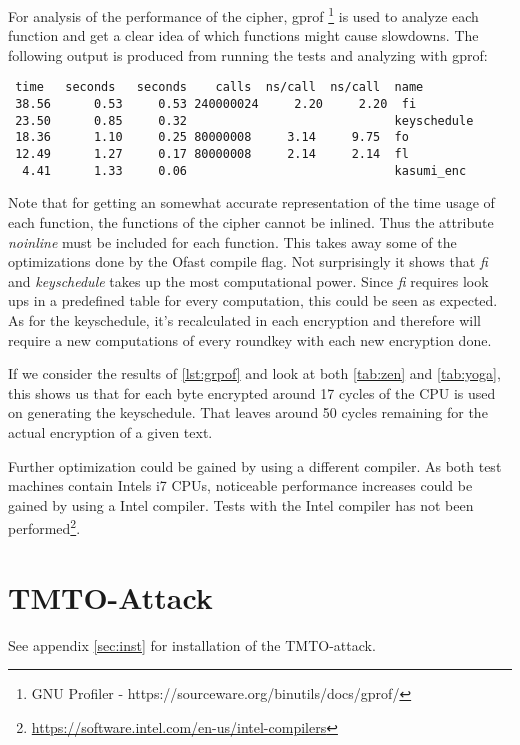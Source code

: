 For analysis of the performance of the cipher, gprof \footnote{GNU
  Profiler - https://sourceware.org/binutils/docs/gprof/} is used to
analyze each function and get a clear idea of which functions might
cause slowdowns. The following output is produced from running the
tests and analyzing with gprof:
\begin{lstlisting}[caption=Gprof output,captionpos=b,label=lst:grpof]
    %   cumulative   self              self     total
 time   seconds   seconds    calls  ns/call  ns/call  name
 38.56      0.53     0.53 240000024     2.20     2.20  fi
 23.50      0.85     0.32                             keyschedule
 18.36      1.10     0.25 80000008     3.14     9.75  fo
 12.49      1.27     0.17 80000008     2.14     2.14  fl
  4.41      1.33     0.06                             kasumi_enc
\end{lstlisting}
Note that for getting an somewhat accurate representation of the time usage of
each function, the functions of the cipher cannot be inlined. Thus the
attribute \textit{noinline} must be included for each function. This
takes away some of the optimizations done by the Ofast compile
flag. Not surprisingly it shows that \textit{fi} and
\textit{keyschedule} takes up the most computational
power. Since \textit{fi} requires look ups in a predefined table for every computation, this
could be seen as expected. As for the keyschedule, it's recalculated
in each encryption and therefore will require a new computations of
every roundkey with each new encryption done.

If we consider the results of \ref{lst:grpof} and look at both
\ref{tab:zen} and \ref{tab:yoga}, this shows us that for each byte
encrypted around 17 cycles of the CPU is used on generating the
keyschedule. That leaves around 50 cycles remaining for the actual
encryption of a given  text.

Further optimization could be gained by using a different compiler. As
both test machines contain Intels i7 CPUs, noticeable performance
increases could be gained by using a Intel compiler. Tests with the
Intel compiler has not been performed\footnote{\url{https://software.intel.com/en-us/intel-compilers}}.

\section{TMTO-Attack}

See appendix \ref{sec:inst} for installation of the TMTO-attack.

